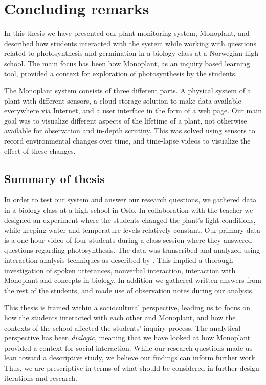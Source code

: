 \chapter{Concluding remarks}
In this thesis we have presented our plant monitoring system, Monoplant, and described how students interacted with the system while working with questions related to photosynthesis and germination in a biology class at a Norwegian high school. The main focus has been how Monoplant, as an inquiry based learning tool, provided a context for exploration of photosynthesis by the students. 

The Monoplant system consists of three different parts. A physical system of a plant with different sensors, a cloud storage solution to make data available everywhere via Internet, and a user interface in the form of a web page. Our main goal was to visualize different aspects of the lifetime of a plant, not otherwise available for observation and in-depth scrutiny. This was solved using sensors to record environmental changes over time, and time-lapse videos to visualize the effect of these changes. 

\section{Summary of thesis}
In order to test our system and answer our research questions, we gathered data in a biology class at a high school in Oslo. In collaboration with the teacher we designed an experiment where the students changed the plant's light conditions, while keeping water and temperature levels relatively constant. Our primary data is a one-hour video of four students during a class session where they answered questions regarding photosynthesis. The data was transcribed and analyzed using interaction analysis techniques as described by \citet{jordan1995interaction}. This implied a thorough investigation of spoken utterances, nonverbal interaction, interaction with Monoplant and concepts in biology. In addition we gathered written answers from the rest of the students, and made use of observation notes during our analysis. 

This thesis is framed within a sociocultural perspective, leading us to focus on how the students interacted with each other and Monoplant, and how the contexts of the school affected the students' inquiry process. The analytical perspective has been \emph{dialogic}, meaning that we have looked at how Monoplant provided a context for social interaction. While our research questions made us lean toward a descriptive study, we believe our findings can inform further work. Thus, we are prescriptive in terms of what should be considered in further design iterations and research.


